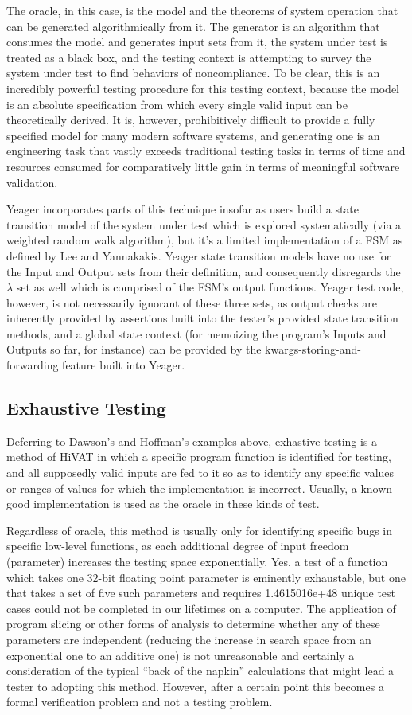 The oracle, in this case, is the model and the theorems of system operation that can be generated algorithmically from it. The generator is an algorithm that consumes the model and generates input sets from it, the system under test is treated as a black box, and the testing context is attempting to survey the system under test to find behaviors of noncompliance. To be clear, this is an incredibly powerful testing procedure for this testing context, because the model is an absolute specification from which every single valid input can be theoretically derived. It is, however, prohibitively difficult to provide a fully specified model for many modern software systems, and generating one is an engineering task that vastly exceeds traditional testing tasks in terms of time and resources consumed for comparatively little gain in terms of meaningful software validation.

Yeager incorporates parts of this technique insofar as users build a state transition model of the system under test which is explored systematically (via a weighted random walk algorithm), but it's a limited implementation of a FSM as defined by Lee and Yannakakis. Yeager state transition models have no use for the Input and Output sets from their definition, and consequently disregards the $\lambda$ set as well which is comprised of the FSM's output functions. Yeager test code, however, is not necessarily ignorant of these three sets, as output checks are inherently provided by assertions built into the tester's provided state transition methods, and a global state context (for memoizing the program's Inputs and Outputs so far, for instance) can be provided by the kwargs-storing-and-forwarding feature built into Yeager.

\subsection{Exhaustive Testing}
Deferring to Dawson's and Hoffman's examples above, exhastive testing is a method of HiVAT in which a specific program function is identified for testing, and all supposedly valid inputs are fed to it so as to identify any specific values or ranges of values for which the implementation is incorrect. Usually, a known-good implementation is used as the oracle in these kinds of test.

Regardless of oracle, this method is usually only for identifying specific bugs in specific low-level functions, as each additional degree of input freedom (parameter) increases the testing space exponentially. Yes, a test of a function which takes one 32-bit floating point parameter is eminently exhaustable, but one that takes a set of five such parameters and requires 1.4615016e+48 unique test cases could not be completed in our lifetimes on a computer. The application of program slicing \citep{gallagher1991using} or other forms of analysis to determine whether any of these parameters are independent (reducing the increase in search space from an exponential one to an additive one) is not unreasonable and certainly a consideration of the typical ``back of the napkin'' calculations that might lead a tester to adopting this method. However, after a certain point this becomes a formal verification problem and not a testing problem.

